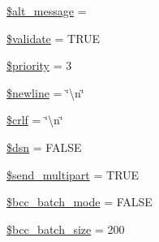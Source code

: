 \begin{DoxyCompactItemize}
\mbox{\hyperlink{class_c_i___email_a266e7a7eb7cbcb0fc73a94b22a310a14}{\$alt\+\_\+message}} = \textquotesingle{}\textquotesingle{}
\item 
\mbox{\hyperlink{class_c_i___email_a320b75b46e1832c327d9d47b4cea9e7d}{\$validate}} = T\+R\+UE
\item 
\mbox{\hyperlink{class_c_i___email_a2677e505e860db863720ac4e216fd3f2}{\$priority}} = 3
\item 
\mbox{\hyperlink{class_c_i___email_a8735d5c31c4af1004825e6a28f236aeb}{\$newline}} = \char`\"{}\textbackslash{}n\char`\"{}
\item 
\mbox{\hyperlink{class_c_i___email_a85554ab78e9a915b4299dd3f1d5c2866}{\$crlf}} = \char`\"{}\textbackslash{}n\char`\"{}
\item 
\mbox{\hyperlink{class_c_i___email_a6441cca8c9fa11e16d2017e8cb733c10}{\$dsn}} = F\+A\+L\+SE
\item 
\mbox{\hyperlink{class_c_i___email_ad646213e73754a396d49eacaa7fc8218}{\$send\+\_\+multipart}} = T\+R\+UE
\item 
\mbox{\hyperlink{class_c_i___email_ac67d3df67b03960980abe368f03e088e}{\$bcc\+\_\+batch\+\_\+mode}} = F\+A\+L\+SE
\item 
\mbox{\hyperlink{class_c_i___email_abdb56da29fb9feee14d2374170c3cb5c}{\$bcc\+\_\+batch\+\_\+size}} = 200
\end{DoxyCompactItemize}
